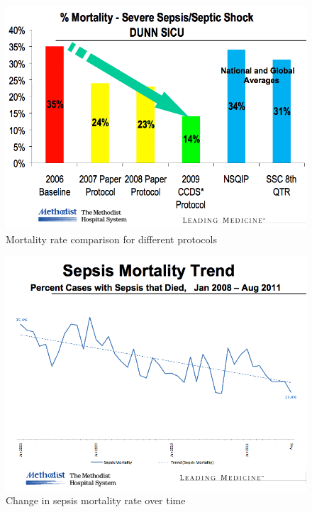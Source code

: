 \documentclass{sig-alternate}
\begin{document}
\begin{figure}
	\begin{center}
		\includegraphics[width=1.0\linewidth]{methodist1.png}
	\end{center}
	\caption{Mortality rate comparison for different protocols}
	\label{fig:mortality_rate}
\end{figure}

\begin{figure}
	\begin{center}
		\includegraphics[width=1.0\linewidth]{methodist2.png}
	\end{center}
	\caption{Change in sepsis mortality rate over time}
	\label{fig:mortality_rate_time}
\end{figure}
\end{document}
